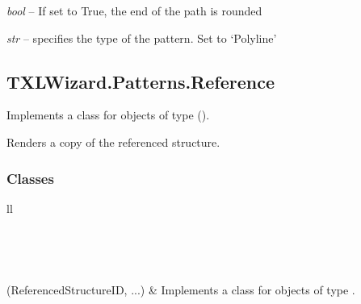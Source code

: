 \documentclass[letterpaper,10pt,english]{sphinxmanual}
\begin{document}
\begin{fulllineitems}
\begin{fulllineitems}
\end{fulllineitems}


\begin{fulllineitems}
\label{Chapters/PythonModuleReference/Patterns/TXLWizard.Patterns.Polyline:TXLWizard.Patterns.Polyline.Polyline.RoundCaps}
\emph{bool} -- If set to True, the end of the path is rounded

\end{fulllineitems}


\begin{fulllineitems}
\label{Chapters/PythonModuleReference/Patterns/TXLWizard.Patterns.Polyline:TXLWizard.Patterns.Polyline.Polyline.Type}
\emph{str} -- specifies the type of the pattern. Set to `Polyline'

\end{fulllineitems}


\end{fulllineitems}



\subsection{TXLWizard.Patterns.Reference}
\label{Chapters/PythonModuleReference/Patterns/TXLWizard.Patterns.Reference:txlwizard-patterns-reference}\label{Chapters/PythonModuleReference/Patterns/TXLWizard.Patterns.Reference:module-TXLWizard.Patterns.Reference}\label{Chapters/PythonModuleReference/Patterns/TXLWizard.Patterns.Reference::doc}
Implements a class for  objects of type  ().

Renders a copy of the referenced structure.


\subsubsection{Classes}
\label{Chapters/PythonModuleReference/Patterns/TXLWizard.Patterns.Reference:classes}
\begin{longtable}{ll}
\hline
\endfirsthead

%
{{}} \\
\hline
\endhead

\hline {} \\ \hline
\endfoot

\endlastfoot


{\hyperref[Chapters/PythonModuleReference/Patterns/TXLWizard.Patterns.Reference:TXLWizard.Patterns.Reference.Reference]{}}(ReferencedStructureID, ...)
 & 
Implements a class for  objects of type .
\\
\hline\end{longtable}
\end{document}
